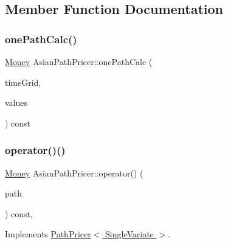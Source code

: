 \subsection{Member Function Documentation}
\hypertarget{class_asian_path_pricer_a33d53acde0a8553f4adcee70c47f50b4}{}\label{class_asian_path_pricer_a33d53acde0a8553f4adcee70c47f50b4} 
\subsubsection{\texorpdfstring{one\+Path\+Calc()}{onePathCalc()}}
{\footnotesize\ttfamily \hyperlink{_name_def_8h_a5a9d48c16a694e9a2d9f1eca730dc8c5}{Money} Asian\+Path\+Pricer\+::one\+Path\+Calc (\begin{DoxyParamCaption}\item[{const vector$<$ \hyperlink{_name_def_8h_ac2d3e0ba793497bcca555c7c2cf64ff3}{Time} $>$ \&}]{time\+Grid,  }\item[{const vector$<$ vector$<$ \hyperlink{_name_def_8h_a642a6c5fd87319d922637de0e0bb0305}{Quote} $>$ $>$ \&}]{values }\end{DoxyParamCaption}) const\hspace{0.3cm}{\ttfamily [private]}}

\hypertarget{class_asian_path_pricer_a929e8a33447f977bfc947e1d5344e353}{}\label{class_asian_path_pricer_a929e8a33447f977bfc947e1d5344e353} 
\subsubsection{\texorpdfstring{operator()()}{operator()()}}
{\footnotesize\ttfamily \hyperlink{_name_def_8h_a5a9d48c16a694e9a2d9f1eca730dc8c5}{Money} Asian\+Path\+Pricer\+::operator() (\begin{DoxyParamCaption}\item[{const \hyperlink{class_path}{Path}$<$ \hyperlink{struct_single_variate}{Single\+Variate} $>$ \&}]{path }\end{DoxyParamCaption}) const\hspace{0.3cm}{\ttfamily [override]}, {\ttfamily [virtual]}}



Implements \hyperlink{class_path_pricer_a14b2a03f259bb56a24a66c9b95bdcf67}{Path\+Pricer$<$ Single\+Variate $>$}.



